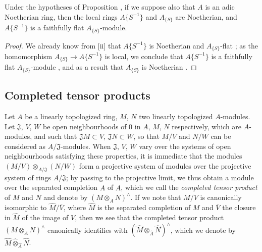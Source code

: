 \begin{corollary}[7.6.18]
\label{0.7.6.18}
Under the hypotheses of Proposition , if we suppose also that
$A$ is an adic Noetherian ring, then the local rings $A\{S^{-1}\}$ and $A_{\{S\}}$ are Noetherian,
and $A\{S^{-1}\}$ is a faithfully flat $A_{\{S\}}$-module.
\end{corollary}

\begin{proof}
We already know from [ii] that $A\{S^{-1}\}$ is Noetherian and
$A_{\{S\}}$-flat ; as the homomorphism $A_{\{S\}}\to A\{S^{-1}\}$
is local, we conclude that $A\{S^{-1}\}$ is a faithfully flat $A_{\{S\}}$-module
, and as a result that $A_{\{S\}}$ is Noetherian .
\end{proof}

\subsection{Completed tensor products}
\label{subsection:0.7.7}

\begin{env}[7.7.1]
\label{0.7.7.1}
Let $A$ be a linearly topologized ring, $M$, $N$ two linearly topologized $A$-modules. Let
$\mathfrak{J}$, $V$, $W$ be open neighbourhoods of $0$ in $A$, $M$, $N$ respectively, which are
$A$-modules, and such that $\mathfrak{J}M\subset V$, $\mathfrak{J}N\subset W$, so that
$M/V$ and $N/W$ can be considered as $A/\mathfrak{J}$-modules. When $\mathfrak{J}$, $V$, $W$
vary over the systems of open neighbourhoods satisfying these properties, it is immediate that the
modules $(M/V)\otimes_{A/\mathfrak{J}}(N/W)$ form a projective system of modules
over the projective system of rings $A/\mathfrak{J}$; by passing to the projective limit, we
thus obtain a module over the separated completion $\widehat{A}$ of $A$, which we call the
\emph{completed tensor product} of $M$ and $N$ and denote by $(M\otimes_A N)^\wedge$. If we note
that $M/V$ is canonically isomorphic to $\widehat{M}/\overline{V}$, where $\widehat{M}$ is the
separated completion of $M$ and $\overline{V}$ the closure in $\widehat{M}$ of the image of $V$,
then we see that the completed tensor product $(M\otimes_A N)^\wedge$ canonically identifies with
$(\widehat{M}\otimes_{\widehat{A}}\widehat{N})^\wedge$, which we denote by $\widehat{M}\widehat{\otimes}_{\widehat{A}}\widehat{N}$.
\end{env}


